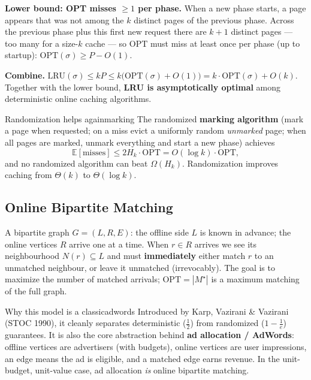 \textbf{Lower bound: OPT misses $\ge 1$ per phase.} When a new phase starts, a page appears that was not among the $k$ distinct pages of the previous phase. Across the previous phase plus this first new request there are $k+1$ distinct pages --- too many for a size-$k$ cache --- so $\mathrm{OPT}$ must miss at least once per phase (up to startup): $\mathrm{OPT}(\sigma) \ge P - O(1)$.

\textbf{Combine.} $\mathrm{LRU}(\sigma) \le kP \le k\bigl(\mathrm{OPT}(\sigma) + O(1)\bigr) = k\cdot\mathrm{OPT}(\sigma) + O(k)$. Together with the lower bound, \textbf{LRU is asymptotically optimal} among deterministic online caching algorithms.

\begin{remark}{Randomization helps again}{marking}
The randomized \textbf{marking algorithm} (mark a page when requested; on a miss evict a uniformly random \emph{unmarked} page; when all pages are marked, unmark everything and start a new phase) achieves
\[
\mathbb{E}[\text{misses}] \le 2H_k \cdot \mathrm{OPT} = O(\log k)\cdot \mathrm{OPT},
\]
and no randomized algorithm can beat $\Omega(H_k)$. Randomization improves caching from $\Theta(k)$ to $\Theta(\log k)$.
\end{remark}

\subsection{Online Bipartite Matching}

A bipartite graph $G = (L, R, E)$: the offline side $L$ is known in advance; the online vertices $R$ arrive one at a time. When $r \in R$ arrives we see its neighbourhood $N(r) \subseteq L$ and must \textbf{immediately} either match $r$ to an unmatched neighbour, or leave it unmatched (irrevocably). The goal is to maximize the number of matched arrivals; $\mathrm{OPT} = |M^\star|$ is a maximum matching of the full graph.

\begin{remark}{Why this model is a classic}{adwords}
Introduced by Karp, Vazirani \& Vazirani (STOC 1990), it cleanly separates deterministic ($\tfrac12$) from randomized ($1 - \tfrac1e$) guarantees. It is also the core abstraction behind \textbf{ad allocation / AdWords}: offline vertices are advertisers (with budgets), online vertices are user impressions, an edge means the ad is eligible, and a matched edge earns revenue. In the unit-budget, unit-value case, ad allocation \emph{is} online bipartite matching.
\end{remark}


